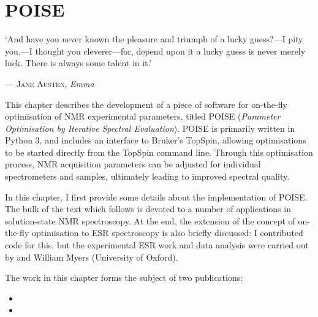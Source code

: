 \chapter{POISE}
\label{chpt:poise}

\epigraph{\singlespacing%
`And have you never known the pleasure and triumph of a lucky guess?---I pity you.---I thought you cleverer---for, depend upon it a lucky guess is never merely luck. There is always some talent in it.'%
}{--- \textsc{Jane Austen}, \textit{Emma}}

This chapter describes the development of a piece of software for on-the-fly optimisation of NMR experimental parameters, titled POISE (\textit{Parameter Optimisation by Iterative Spectral Evaluation}).
POISE is primarily written in Python 3, and includes an interface to Bruker's TopSpin, allowing optimisations to be started directly from the TopSpin command line.
Through this optimisation process, NMR acquisition parameters can be adjusted for individual spectrometers and samples, ultimately leading to improved spectral quality.

In this chapter, I first provide some details about the implementation of POISE.
The bulk of the text which follows is devoted to a number of applications in solution-state NMR spectroscopy.
At the end, the extension of the concept of on-the-fly optimisation to ESR spectroscopy is also briefly discussed: I contributed code for this, but the experimental ESR work and data analysis were carried out by \JBV{} and William Myers (University of Oxford).

The work in this chapter forms the subject of two publications:

\begin{itemize}
    \item {}
    \item {}
\end{itemize}

\clearpage








\printbibliography[heading=subbibnumbered]{}
